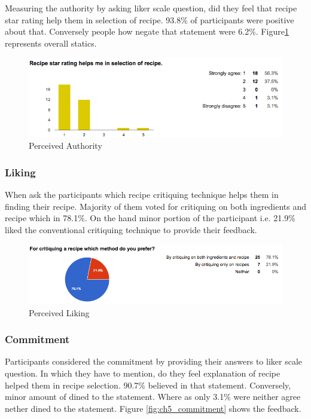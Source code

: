 Measuring the authority by asking liker scale question, did they feel that recipe star rating help them in selection of recipe. 93.8\% of participants were positive about that. Conversely people how negate that statement were 6.2\%. Figure\ref{fig:ch5_stat_authority} represents overall statics. 

\begin{figure}[h]
	\centering
	\includegraphics[width=1\linewidth]{figures/ch5_stat_authority}
	\caption{Perceived Authority}
	\label{fig:ch5_stat_authority}
\end{figure}

\subsubsection{Liking}

When ask the participants which recipe critiquing technique helps them in finding their recipe. Majority of them voted for critiquing on both ingredients and recipe which in 78.1\%. On the hand minor portion of the participant i.e. 21.9\% liked the conventional critiquing technique to provide their feedback.

\begin{figure}[h]
	\centering
	\includegraphics[width=1\linewidth]{figures/ch5_stat_liking.png}
	\caption{Perceived Liking}
	\label{fig:ch5_stat_liking}
\end{figure}

\subsubsection{Commitment}

Participants considered the commitment by providing their answers to liker scale question. In which they have to mention, do they feel explanation of recipe helped them in recipe selection. 90.7\% believed in that statement. Conversely, minor amount of dined to the statement. Where as only 3.1\% were neither agree nether dined to the statement. Figure \ref{fig:ch5_commitment} shows the feedback.

